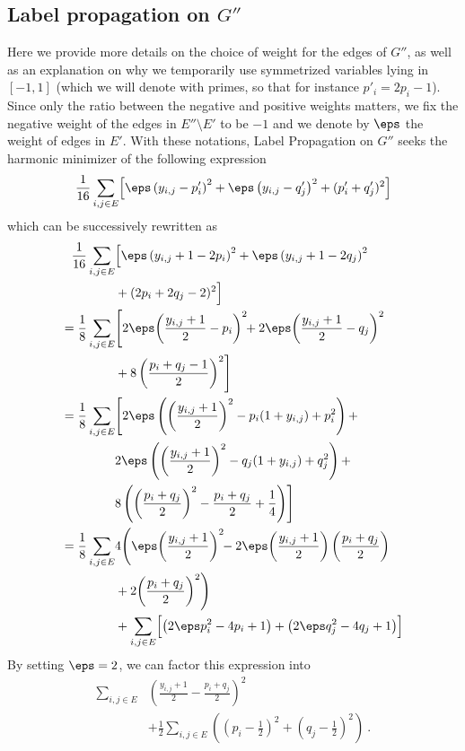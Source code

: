 \subsection{Label propagation on $G''$}
\label{ssec:troll_lprop_weights}
Here we provide more details on the choice of weight for the edges of $G''$, as
well as an explanation on why we temporarily use symmetrized variables lying in
$[-1, 1]$ (which we will denote with primes, so that for instance $p'_i =
2p_i-1$). Since only the ratio between the negative and positive weights
matters, we fix the negative weight of the edges in $E''\setminus E'$ to be
$-1$ and we denote by $\eps$ the weight of edges in $E'$.  With these notations,
Label Propagation on $G''$ seeks the harmonic minimizer of the following
expression 
\begin{equation*}
  \frac{1}{16} \sum_{i,j \in E} \Bigl[ \eps\left(y_{i,j} - p_i'\right)^2 + \eps\left(y_{i,j} - q_j'\right)^2 + (p'_i+q_j')^2 \Bigr] \\
\end{equation*}
which can be successively rewritten as
\begin{align*}
  \frac{1}{16} \sum_{i,j \in E} & \Bigl[ \eps\left(y_{i,j}+1 - 2p_i\right)^2 + \eps\left(y_{i,j}+1 - 2q_j\right)^2
\\&
	+ (2p_i +2q_j -2)^2 \Bigr]
\\=
	\frac{1}{8} \sum_{i,j \in E} & \Biggl[ 2\eps\!\left(\frac{y_{i,j}+1}{2} - p_i\right)^2\!\! +  2\eps\!\left(\frac{y_{i,j}+1}{2} - q_j\right)^2
\\&
	+ 8\left(\frac{p_i +q_j -1}{2}\right)^2 \Biggr]
\\=
  \frac{1}{8}\sum_{i,j \in E} & \Biggl[ 2\eps\left(\left(\frac{y_{i,j}+1}{2}\right)^2 - p_i(1+y_{i,j}) + p_i^2\right) + \\
                              & 2\eps\left(\left(\frac{y_{i,j}+1}{2}\right)^2 - q_j(1+y_{i,j}) + q_j^2\right) +  \\
                              & 8\left(\left(\frac{p_i +q_j}{2}\right)^2 - \frac{p_i+q_j}{2} + \frac{1}{4} \right) \Biggr]
\\=
  \frac{1}{8}\sum_{i,j \in E} & 4\Biggl(\eps\!\left(\frac{y_{i,j}+1}{2}\right)^2\!\! -
  2\eps\!\left(\frac{y_{i,j}+1}{2}\right)\left(\frac{p_i+q_j}{2}\right)
\\&
  + 2\!\left(\frac{p_i +q_j}{2}\right)^2\Biggr)
\\&+
  \sum_{i,j \in E} \Bigl[ \left(2\eps p_i^2 - 4p_i + 1\right) + \left(2\eps q_j^2 - 4q_j + 1\right) \Bigr]
\end{align*}
%
By setting $\eps=2$, we can factor this expression into 
\begin{align*}
  \sum_{i,j \in E} &\left(\frac{y_{i,j}+1}{2} - \frac{p_i+q_j}{2}\right)^2
\\&
  + \frac{1}{2}\sum_{i,j \in E} \left(\left(p_i - \frac{1}{2}\right )^2 + \left(q_j - \frac{1}{2}\right)^2 \right)~.
\end{align*}

